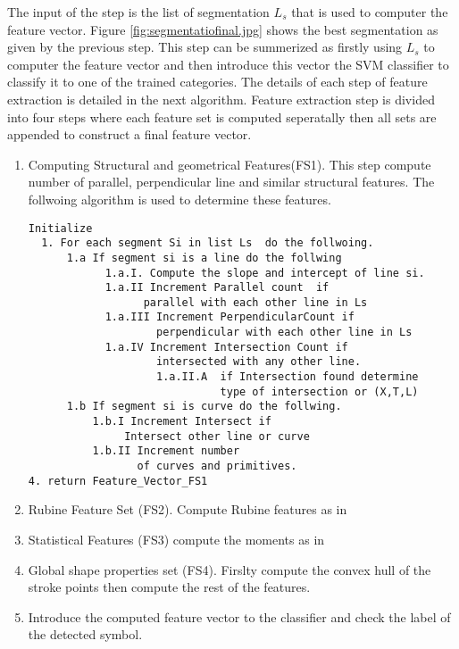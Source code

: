 	The input of the step is the list of segmentation $L_s$ that is used to computer the feature vector. Figure \ref{fig:segmentatiofinal.jpg} shows the best segmentation as given by the previous step. This step can be summerized as firstly using $L_s$ to computer the feature vector and then introduce this vector the SVM classifier to classify it to one of the trained categories. The details of each step of feature extraction is detailed in the next algorithm. Feature extraction step is divided into four steps where each feature set is computed seperatally then all sets are appended to construct a final feature vector. 
	
\begin{enumerate}
	\item Computing Structural and geometrical Features(FS1). This step compute number of parallel, perpendicular line and similar structural features. The follwoing algorithm is used to determine these features. 
	\begin{verbatim}
Initialize 
  1. For each segment Si in list Ls  do the follwoing. 
      1.a If segment si is a line do the follwing 
            1.a.I. Compute the slope and intercept of line si. 
            1.a.II Increment Parallel count  if 
                  parallel with each other line in Ls
            1.a.III Increment PerpendicularCount if 
                    perpendicular with each other line in Ls 
            1.a.IV Increment Intersection Count if 
                    intersected with any other line. 
                    1.a.II.A  if Intersection found determine 
                              type of intersection or (X,T,L)
      1.b If segment si is curve do the follwing. 
          1.b.I Increment Intersect if
               Intersect other line or curve
          1.b.II Increment number 
                 of curves and primitives. 
4. return Feature_Vector_FS1
\end{verbatim}	
	\item Rubine Feature Set (FS2).  Compute Rubine features as in \cite{gestureexample12} 
	\item Statistical Features (FS3) compute the moments as in \cite{zernike61}
	\item Global shape properties set (FS4). Firslty compute the convex hull of the stroke points then compute the rest of the features. 
	
	\item Introduce the computed feature vector to the classifier and check the label of the detected symbol. 
\end{enumerate}
	

